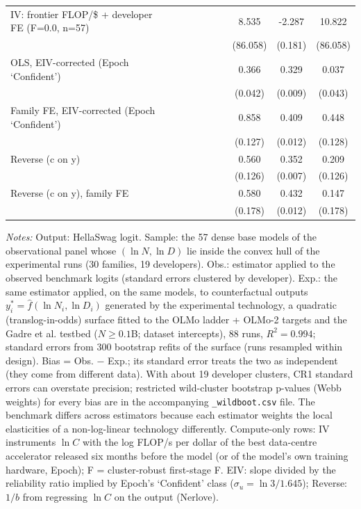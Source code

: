 \begin{table}[!htbp]
\begin{threeparttable}
\begin{tabular}{lccccccccc}
IV: frontier FLOP/\$ + developer FE (F=0.0, n=57) &  &  &  &  &  &  & 8.535 & -2.287 & 10.822 \\
 &  &  &  &  &  &  & (86.058) & (0.181) & (86.058) \\
OLS, EIV-corrected (Epoch `Confident') &  &  &  &  &  &  & 0.366 & 0.329 & 0.037 \\
 &  &  &  &  &  &  & (0.042) & (0.009) & (0.043) \\
Family FE, EIV-corrected (Epoch `Confident') &  &  &  &  &  &  & 0.858 & 0.409 & 0.448 \\
 &  &  &  &  &  &  & (0.127) & (0.012) & (0.128) \\
Reverse (c on y) &  &  &  &  &  &  & 0.560 & 0.352 & 0.209 \\
 &  &  &  &  &  &  & (0.126) & (0.007) & (0.126) \\
Reverse (c on y), family FE &  &  &  &  &  &  & 0.580 & 0.432 & 0.147 \\
 &  &  &  &  &  &  & (0.178) & (0.012) & (0.178) \\
\bottomrule
\end{tabular}
\begin{tablenotes}[flushleft]
\footnotesize
\item \textit{Notes:} Output: HellaSwag logit. Sample: the 57 dense base models of the observational panel whose $(\ln N,\ln D)$ lie inside the convex hull of the experimental runs (30 families, 19 developers). Obs.: estimator applied to the observed benchmark logits (standard errors clustered by developer). Exp.: the same estimator applied, on the same models, to counterfactual outputs $y^*_i=\hat f(\ln N_i,\ln D_i)$ generated by the experimental technology, a quadratic (translog-in-odds) surface fitted to the OLMo ladder + OLMo-2 targets and the Gadre et al. testbed ($N\geq0.1$B; dataset intercepts), 88 runs, $R^2=0.994$; standard errors from 300 bootstrap refits of the surface (runs resampled within design). Bias = Obs. $-$ Exp.; its standard error treats the two as independent (they come from different data). With about 19 developer clusters, CR1 standard errors can overstate precision; restricted wild-cluster bootstrap p-values (Webb weights) for every bias are in the accompanying \texttt{\_wildboot.csv} file. The benchmark differs across estimators because each estimator weights the local elasticities of a non-log-linear technology differently. Compute-only rows: IV instruments $\ln C$ with the log FLOP/s per dollar of the best data-centre accelerator released six months before the model (or of the model's own training hardware, Epoch); F = cluster-robust first-stage F. EIV: slope divided by the reliability ratio implied by Epoch's `Confident' class ($\sigma_u=\ln 3/1.645$); Reverse: $1/b$ from regressing $\ln C$ on the output (Nerlove).
\end{tablenotes}
\end{threeparttable}
\end{table}
